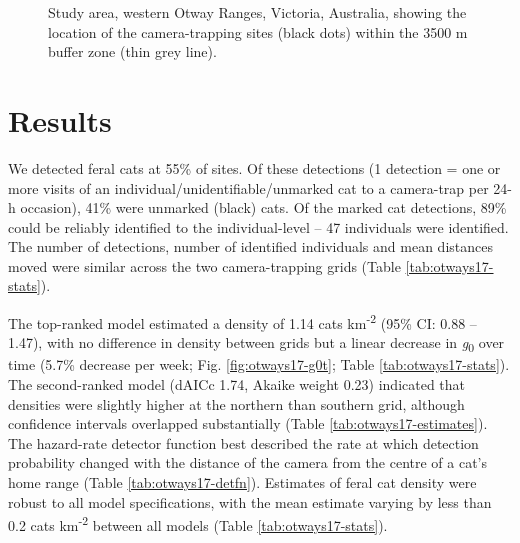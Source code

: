 \documentclass[11pt,a4paper,titlepage,twoside,openright]{style/unimelbthesis}
\begin{document}
\begin{mainmatter}
\begin{figure}
\caption{Study area, western Otway Ranges, Victoria, Australia, showing the location of the camera-trapping sites (black dots) within the 3500 m buffer zone (thin grey line).}\label{fig:otways17-map}
\end{figure}
\newpage

\hypertarget{results}{%
\section{Results}\label{results}}

We detected feral cats at 55\% of sites. Of these detections (1 detection = one or more visits of an individual/unidentifiable/unmarked cat to a camera-trap per 24-h occasion), 41\% were unmarked (black) cats. Of the marked cat detections, 89\% could be reliably identified to the individual-level -- 47 individuals were identified. The number of detections, number of identified individuals and mean distances moved were similar across the two camera-trapping grids (Table \ref{tab:otways17-stats}).

The top-ranked model estimated a density of 1.14 cats km\textsuperscript{-2} (95\% CI: 0.88 -- 1.47), with no difference in density between grids but a linear decrease in \emph{g}\textsubscript{0} over time (5.7\% decrease per week; Fig. \ref{fig:otways17-g0t}; Table \ref{tab:otways17-stats}). The second-ranked model (dAICc 1.74, Akaike weight 0.23) indicated that densities were slightly higher at the northern than southern grid, although confidence intervals overlapped substantially (Table \ref{tab:otways17-estimates}). The hazard-rate detector function best described the rate at which detection probability changed with the distance of the camera from the centre of a cat's home range (Table \ref{tab:otways17-detfn}). Estimates of feral cat density were robust to all model specifications, with the mean estimate varying by less than 0.2 cats km\textsuperscript{-2} between all models (Table \ref{tab:otways17-stats}).

\newpage

\(~\)

\(~\)


\end{mainmatter}
\end{document}
